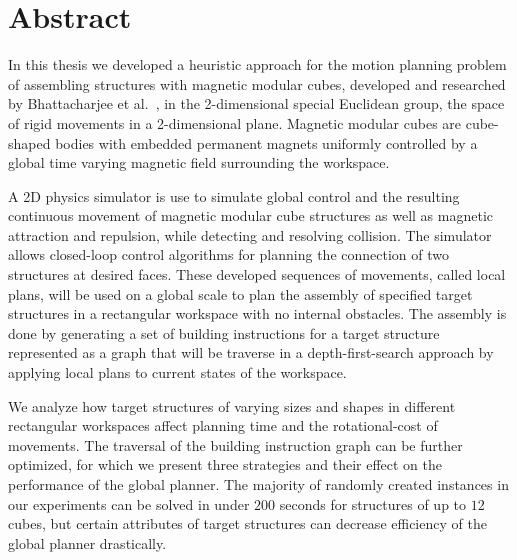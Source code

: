\chapter*{Abstract}

In this thesis we developed a heuristic approach for the motion planning problem of assembling structures with magnetic modular cubes, developed and researched by Bhattacharjee et al.\ \cite{Bhattacharjee2022}, in the 2-dimensional special Euclidean group, the space of rigid movements in a 2-dimensional plane.
Magnetic modular cubes are cube-shaped bodies with embedded permanent magnets uniformly controlled by a global time varying magnetic field surrounding the workspace.

A 2D physics simulator is use to simulate global control and the resulting continuous movement of magnetic modular cube structures as well as magnetic attraction and repulsion, while detecting and resolving collision.
The simulator allows closed-loop control algorithms for planning the connection of two structures at desired faces.
These developed sequences of movements, called local plans, will be used on a global scale to plan the assembly of specified target structures in a rectangular workspace with no internal obstacles.
The assembly is done by generating a set of building instructions for a target structure represented as a graph that will be traverse in a depth-first-search approach by applying local plans to current states of the workspace.

We analyze how target structures of varying sizes and shapes in different rectangular workspaces affect planning time and the rotational-cost of movements.
The traversal of the building instruction graph can be further optimized, for which we present three strategies and their effect on the performance of the global planner.
The majority of randomly created instances in our experiments can be solved in under $200$ seconds for structures of up to $12$ cubes, but certain attributes of target structures can decrease efficiency of the global planner drastically.